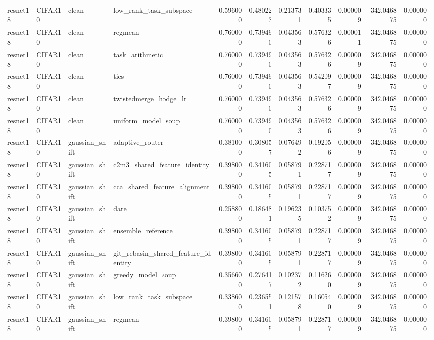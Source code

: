 \begin{tabular}{llllrrrrrrr}
resnet18 & CIFAR10 & clean & low_rank_task_subspace & 0.596000 & 0.480223 & 0.213731 & 0.403335 & 0.000009 & 342.046875 & 0.000000 \\
resnet18 & CIFAR10 & clean & regmean & 0.760000 & 0.739490 & 0.043563 & 0.576326 & 0.000011 & 342.046875 & 0.000000 \\
resnet18 & CIFAR10 & clean & task_arithmetic & 0.760000 & 0.739490 & 0.043563 & 0.576326 & 0.000009 & 342.046875 & 0.000000 \\
resnet18 & CIFAR10 & clean & ties & 0.760000 & 0.739490 & 0.043563 & 0.542097 & 0.000009 & 342.046875 & 0.000000 \\
resnet18 & CIFAR10 & clean & twistedmerge_hodge_lr & 0.760000 & 0.739490 & 0.043563 & 0.576326 & 0.000009 & 342.046875 & 0.000000 \\
resnet18 & CIFAR10 & clean & uniform_model_soup & 0.760000 & 0.739490 & 0.043563 & 0.576326 & 0.000009 & 342.046875 & 0.000000 \\
resnet18 & CIFAR10 & gaussian_shift & adaptive_router & 0.381000 & 0.308057 & 0.076492 & 0.192056 & 0.000009 & 342.046875 & 0.000000 \\
resnet18 & CIFAR10 & gaussian_shift & c2m3_shared_feature_identity & 0.398000 & 0.341605 & 0.058791 & 0.228717 & 0.000009 & 342.046875 & 0.000000 \\
resnet18 & CIFAR10 & gaussian_shift & cca_shared_feature_alignment & 0.398000 & 0.341605 & 0.058791 & 0.228717 & 0.000009 & 342.046875 & 0.000000 \\
resnet18 & CIFAR10 & gaussian_shift & dare & 0.258800 & 0.186481 & 0.196235 & 0.103752 & 0.000009 & 342.046875 & 0.000000 \\
resnet18 & CIFAR10 & gaussian_shift & ensemble_reference & 0.398000 & 0.341605 & 0.058791 & 0.228717 & 0.000009 & 342.046875 & 0.000000 \\
resnet18 & CIFAR10 & gaussian_shift & git_rebasin_shared_feature_identity & 0.398000 & 0.341605 & 0.058791 & 0.228717 & 0.000009 & 342.046875 & 0.000000 \\
resnet18 & CIFAR10 & gaussian_shift & greedy_model_soup & 0.356600 & 0.276417 & 0.102372 & 0.116260 & 0.000009 & 342.046875 & 0.000000 \\
resnet18 & CIFAR10 & gaussian_shift & low_rank_task_subspace & 0.338600 & 0.236551 & 0.121578 & 0.160540 & 0.000009 & 342.046875 & 0.000000 \\
resnet18 & CIFAR10 & gaussian_shift & regmean & 0.398000 & 0.341605 & 0.058791 & 0.228717 & 0.000009 & 342.046875 & 0.000000 \\

\end{tabular}
